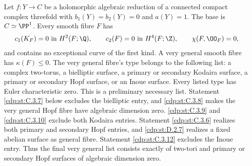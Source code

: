\begin{proposition}\label{cdp:st:C.3.1}
Let $f:Y\to C$ be a holomorphic algebraic reduction of a connected
compact complex threefold with $b_1(Y)=b_2(Y)=0$ and $a(Y)=1$.
The base is $C\simeq\PP^1$. Every smooth fibre $F$ has
\[
 c_1(K_F)=0\text{ in }H^2(F;\Q),\qquad
 c_2(F)=0\text{ in }H^4(F;\Z),\qquad
 \chi(F,\OO_F)=0,
\]
and contains no exceptional curve of the first kind. A very general
smooth fibre has $\kappa(F)\leq0$. The very general fibre's type belongs to the following
list: a complex two-torus, a bielliptic surface, a primary or secondary
Kodaira surface, a primary or secondary Hopf surface, or an Inoue
surface. Every listed type has Euler characteristic zero. This is a
preliminary necessary list. Statement \ref{cdp:st:C.3.7} below excludes the
bielliptic entry, and \ref{cdp:st:C.3.8} makes the very general Hopf fibre have
algebraic dimension zero. \ref{cdp:st:C.3.9} and \ref{cdp:st:C.3.10} exclude both Kodaira
entries. Statement \ref{cdp:st:C.3.6} realizes both primary and secondary Hopf
entries, and \ref{cdp:st:D.2.7} realizes a fixed abelian surface as general
fibre. Statement \ref{cdp:st:C.3.12} excludes the Inoue entry. Thus the
final very general list consists exactly of two-tori and
primary or secondary Hopf surfaces of algebraic dimension zero.
\end{proposition}

